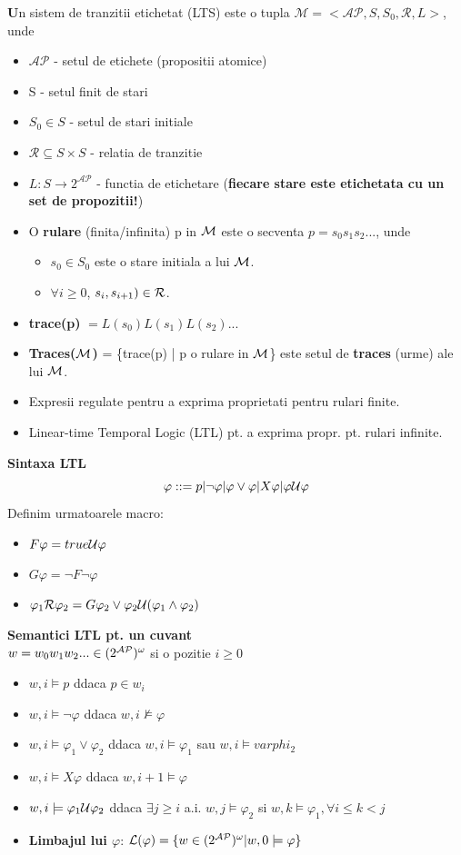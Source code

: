 \documentclass[10pt,a4paper,twocolumn]{report}
\begin{document}
\textbf Un {sistem de tranzitii etichetat (LTS)} este o tupla $\mathcal{M} = <\mathcal{AP}, S, S_0, \mathcal{R}, L>$, unde
\begin{itemize}
\item $\mathcal{AP}$ - setul de etichete (propositii atomice)
\item S - setul finit de stari
\item $S_0 \in S$ - setul de stari initiale
\item $\mathcal{R} \subseteq S \times S$ - relatia de tranzitie
\item $L:S \rightarrow 2^\mathcal{AP}$ - functia de etichetare (\textbf{fiecare stare este etichetata cu un set de propozitii!})
\item O \textbf{rulare} (finita/infinita) p in $\mathcal{M}$ este o secventa $p=s_0s_1s_2...$, unde
	\begin{itemize}
	\item $s_0 \in S_0$ este o stare initiala a lui $\mathcal{M}$.
	\item $\forall i \geq 0$, $s_i,s_{i+1})\in \mathcal{R}$.
	\end{itemize}
\item \textbf{trace(p)} $=L(s_0)L(s_1)L(s_2)...$
\item \textbf{Traces($\mathcal{M}$)} = \{trace(p) | p o rulare in $\mathcal{M}$\} este setul de \textbf{traces} (urme) ale lui $\mathcal{M}$.
\item Expresii regulate pentru a exprima proprietati pentru rulari finite.
\item Linear-time Temporal Logic (LTL) pt. a exprima propr. pt. rulari infinite.
\end{itemize}
\textbf{Sintaxa LTL}
\[\varphi ::= p | \neg \varphi | \varphi \vee \varphi | X\varphi | \varphi \mathcal{U} \varphi\]
Definim urmatoarele macro:
\begin{itemize}
	\item $F\varphi = true \mathcal{U} \varphi$
	\item $G\varphi = \neg F \neg \varphi$
	\item $\varphi_1 \mathcal{R} \varphi_2 = G\varphi_2 \vee \varphi_2\mathcal{U}(\varphi_1 \wedge \varphi_2)$
\end{itemize}
\textbf{Semantici LTL pt. un cuvant}\\$w = w_0w_1w_2...\in(2^{\mathcal{AP}})^\omega$ si o pozitie $i \geq 0$
\begin{itemize}
	\item $w,i \models p$ ddaca $p \in w_i$
	\item $w,i \models \neg \varphi$ ddaca $w,i \not \models \varphi$
	\item $w,i \models \varphi_1 \vee \varphi_2$ ddaca $w,i \models \varphi_1$ sau $w,i \models varphi_2$
	\item $w,i \models X\varphi$ ddaca $w,i+1 \models \varphi$
	\item $w,i \models \varphi_1 \mathcal{U} \varphi_2$ ddaca $\exists j \geq i$ a.i. $w,j \models \varphi_2$ si $w,k \models \varphi_1, \forall i \leq k < j$
	\item \textbf{Limbajul lui $\varphi$}: $\mathcal{L}(\varphi) = \{w \in (2^{\mathcal{AP}})^\omega | w,0 \models \varphi\}$
\end{itemize}
\end{document}

